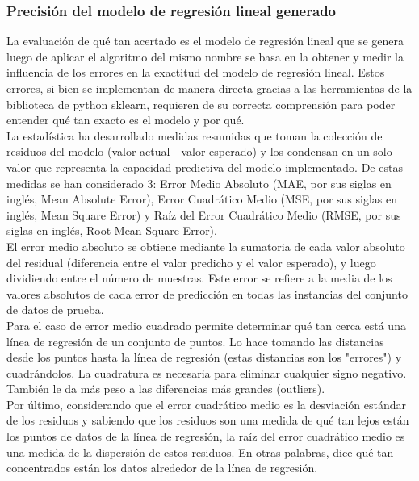 \subsubsection{Precisión del modelo de regresión lineal generado}{
\noindent La evaluación de qué tan acertado es el modelo de regresión lineal que se genera luego de aplicar el algoritmo del mismo nombre se basa en la obtener y medir la influencia de los errores en la exactitud del modelo de regresión lineal. Estos errores, si bien se implementan de manera directa gracias a las herramientas de la biblioteca de python sklearn, requieren de su correcta comprensión para poder entender qué tan exacto es el modelo y por qué.\\
\noindent La estadística ha desarrollado medidas resumidas que toman la colección de residuos del modelo (valor actual - valor esperado) y los condensan en un solo valor que representa la capacidad predictiva del modelo implementado. De estas medidas se han considerado 3: Error Medio Absoluto (MAE, por sus siglas en inglés, Mean Absolute Error), Error Cuadrático Medio (MSE, por sus siglas en inglés, Mean Square Error) y Raíz del Error Cuadrático Medio (RMSE, por sus siglas en inglés, Root Mean Square Error).\cite{16}\\

\noindent El error medio absoluto se obtiene mediante la sumatoria de cada valor absoluto del residual (diferencia entre el valor predicho y el valor esperado), y luego dividiendo entre el número de muestras. Este error  se refiere a la media de los valores absolutos de cada error de predicción en todas las instancias del conjunto de datos de prueba.\\
\noindent Para el caso de error medio cuadrado permite determinar qué tan cerca está una línea de regresión de un conjunto de puntos. Lo hace tomando las distancias desde los puntos hasta la línea de regresión (estas distancias son los "errores") y cuadrándolos. La cuadratura es necesaria para eliminar cualquier signo negativo. También le da más peso a las diferencias más grandes (outliers).\\

\noindent Por último, considerando que el error cuadrático medio es la desviación estándar de los residuos y sabiendo que los residuos son una medida de qué tan lejos están los puntos de datos de la línea de regresión, la raíz del error cuadrático medio es una medida de la dispersión de estos residuos. En otras palabras, dice qué tan concentrados están los datos alrededor de la línea de regresión.\\

}
